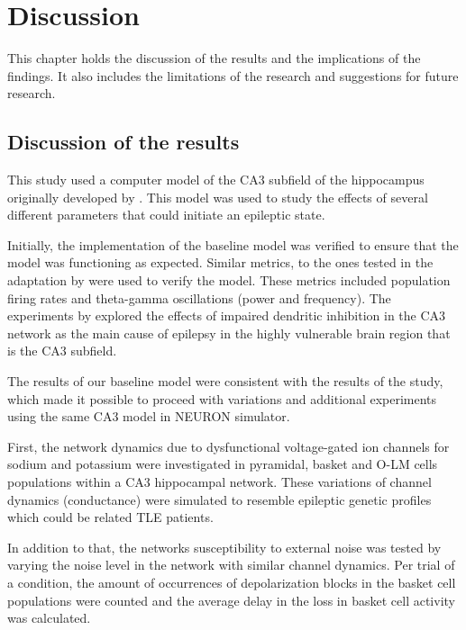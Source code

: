 \chapter{Discussion}

This chapter holds the discussion of the results and the implications of the
findings. It also includes the limitations of the research and suggestions for
future research.

\section{Discussion of the results}
This study used a computer model of the CA3 subfield of the hippocampus originally developed by \textcite{neymotinKetamineDisruptsTheta2011}.
This model was used to study the effects of several different parameters that could initiate an epileptic state.

Initially, the implementation of the baseline model was verified to ensure that the model was functioning as expected.
Similar metrics, to the ones tested in the adaptation by \textcite{sanjayImpairedDendriticInhibition2015} were used to verify the model.
These metrics included population firing rates and theta-gamma oscillations (power and frequency).
The experiments by \textcite{sanjayImpairedDendriticInhibition2015} explored the effects of impaired dendritic inhibition in the CA3 network
as the main cause of epilepsy in the highly vulnerable brain region that is the CA3 subfield.

The results of our baseline model were consistent with the results of the \textcite{sanjayImpairedDendriticInhibition2015} study,
which made it possible to proceed with variations and additional experiments using the same CA3 model in NEURON simulator.

First, the network dynamics due to dysfunctional voltage-gated ion channels for sodium and potassium 
were investigated in pyramidal, basket and O-LM cells populations within a CA3 hippocampal network.
These variations of channel dynamics (conductance) were simulated to resemble epileptic genetic profiles which could be related TLE patients.

In addition to that, the networks susceptibility to external noise was tested by varying the noise level in the network with similar channel dynamics.
Per trial of a condition, the amount of occurrences of depolarization blocks in the basket cell populations were counted and the average delay in the 
loss in basket cell activity was calculated.

